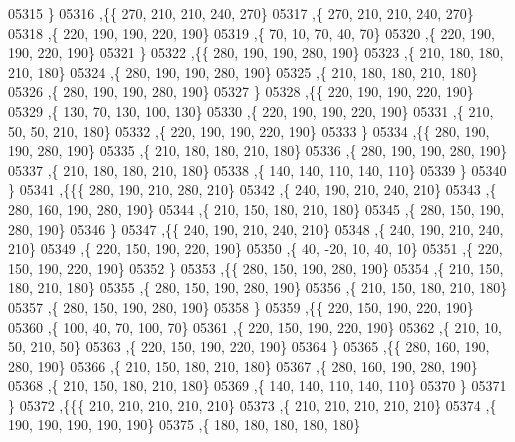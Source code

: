 \begin{DoxyCode}
05315     \}
05316    ,\{\{   270,   210,   210,   240,   270\}
05317     ,\{   270,   210,   210,   240,   270\}
05318     ,\{   220,   190,   190,   220,   190\}
05319     ,\{    70,    10,    70,    40,    70\}
05320     ,\{   220,   190,   190,   220,   190\}
05321     \}
05322    ,\{\{   280,   190,   190,   280,   190\}
05323     ,\{   210,   180,   180,   210,   180\}
05324     ,\{   280,   190,   190,   280,   190\}
05325     ,\{   210,   180,   180,   210,   180\}
05326     ,\{   280,   190,   190,   280,   190\}
05327     \}
05328    ,\{\{   220,   190,   190,   220,   190\}
05329     ,\{   130,    70,   130,   100,   130\}
05330     ,\{   220,   190,   190,   220,   190\}
05331     ,\{   210,    50,    50,   210,   180\}
05332     ,\{   220,   190,   190,   220,   190\}
05333     \}
05334    ,\{\{   280,   190,   190,   280,   190\}
05335     ,\{   210,   180,   180,   210,   180\}
05336     ,\{   280,   190,   190,   280,   190\}
05337     ,\{   210,   180,   180,   210,   180\}
05338     ,\{   140,   140,   110,   140,   110\}
05339     \}
05340    \}
05341   ,\{\{\{   280,   190,   210,   280,   210\}
05342     ,\{   240,   190,   210,   240,   210\}
05343     ,\{   280,   160,   190,   280,   190\}
05344     ,\{   210,   150,   180,   210,   180\}
05345     ,\{   280,   150,   190,   280,   190\}
05346     \}
05347    ,\{\{   240,   190,   210,   240,   210\}
05348     ,\{   240,   190,   210,   240,   210\}
05349     ,\{   220,   150,   190,   220,   190\}
05350     ,\{    40,   -20,    10,    40,    10\}
05351     ,\{   220,   150,   190,   220,   190\}
05352     \}
05353    ,\{\{   280,   150,   190,   280,   190\}
05354     ,\{   210,   150,   180,   210,   180\}
05355     ,\{   280,   150,   190,   280,   190\}
05356     ,\{   210,   150,   180,   210,   180\}
05357     ,\{   280,   150,   190,   280,   190\}
05358     \}
05359    ,\{\{   220,   150,   190,   220,   190\}
05360     ,\{   100,    40,    70,   100,    70\}
05361     ,\{   220,   150,   190,   220,   190\}
05362     ,\{   210,    10,    50,   210,    50\}
05363     ,\{   220,   150,   190,   220,   190\}
05364     \}
05365    ,\{\{   280,   160,   190,   280,   190\}
05366     ,\{   210,   150,   180,   210,   180\}
05367     ,\{   280,   160,   190,   280,   190\}
05368     ,\{   210,   150,   180,   210,   180\}
05369     ,\{   140,   140,   110,   140,   110\}
05370     \}
05371    \}
05372   ,\{\{\{   210,   210,   210,   210,   210\}
05373     ,\{   210,   210,   210,   210,   210\}
05374     ,\{   190,   190,   190,   190,   190\}
05375     ,\{   180,   180,   180,   180,   180\}

\end{DoxyCode}
